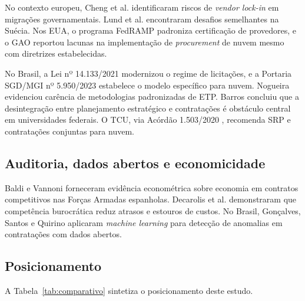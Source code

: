\documentclass[12pt]{article}
\begin{document}
No contexto europeu, Cheng et al. \cite{cheng2017uk_cloud} identificaram riscos de \textit{vendor lock-in} em migrações governamentais. Lund et al. \cite{sweden_cloud2022} encontraram desafios semelhantes na Suécia. Nos EUA, o programa FedRAMP \cite{itif2020fedramp} padroniza certificação de provedores, e o GAO \cite{gao2024cloud} reportou lacunas na implementação de \textit{procurement} de nuvem mesmo com diretrizes estabelecidas.

No Brasil, a Lei nº 14.133/2021 \cite{brasil2021lei14133} modernizou o regime de licitações, e a Portaria SGD/MGI nº 5.950/2023 \cite{brasil2023portaria5950} estabelece o modelo específico para nuvem. Nogueira \cite{nogueira2021contratacoes} evidenciou carência de metodologias padronizadas de ETP. Barros \cite{barros2019governanca} concluiu que a desintegração entre planejamento estratégico e contratações é obstáculo central em universidades federais. O TCU, via Acórdão 1.503/2020 \cite{tcu2020acordao1503}, recomenda SRP e contratações conjuntas para nuvem.

\subsection{Auditoria, dados abertos e economicidade}

Baldi e Vannoni \cite{baldi2018econometric} forneceram evidência econométrica sobre economia em contratos competitivos nas Forças Armadas espanholas. Decarolis et al. \cite{decarolis2023bureaucratic} demonstraram que competência burocrática reduz atrasos e estouros de custos. No Brasil, Gonçalves, Santos e Quirino \cite{goncalves2026deteccao} aplicaram \textit{machine learning} para detecção de anomalias em contratações com dados abertos.

\subsection{Posicionamento}

A Tabela~\ref{tab:comparativo} sintetiza o posicionamento deste estudo.
\end{document}
